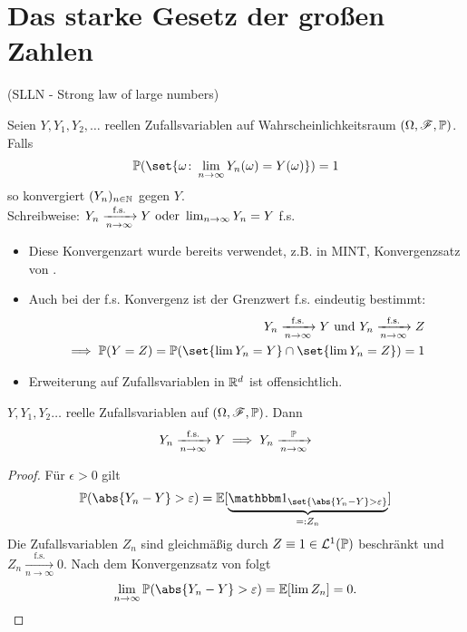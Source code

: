 \section{Das starke Gesetz der großen Zahlen}
(SLLN - Strong law of large numbers)\\
\begin{definition}
	Seien $Y,Y_1, Y_2, \dots$ reellen Zufallsvariablen auf Wahrscheinlichkeitsraum $(\O,\F,\P)$. Falls
	\begin{align*}
		\P(\set{\omega\colon \lim_{n\to \infty} Y_n(\omega) = Y(\omega)}) = 1
	\end{align*}
	so konvergiert $(Y_n)_{n\in \N}$  gegen $Y$.\\
	Schreibweise: $Y_n \xrightarrow[n \to \infty]{\text{f.s.}} Y \oder \lim_{n\to \infty} Y_n = Y$ f.s.
\end{definition}
\begin{*remark}
	\begin{itemize}
		\item Diese Konvergenzart wurde bereits verwendet, z.B. in MINT, Konvergenzsatz von .
		\item Auch bei der f.s. Konvergenz ist der Grenzwert f.s. eindeutig bestimmt:
		\begin{align*}
			Y_n \xrightarrow[n \to \infty]{\text{f.s.}}Y \und Y_n \xrightarrow[n \to \infty]{\text{f.s.}}Z\\
			\implies \P(Y=Z) = \P(\set{\lim Y_n = Y} \cap \set{\lim Y_n = Z}) = 1
		\end{align*}
		\item Erweiterung auf Zufallsvariablen in $\Rd$ ist offensichtlich.
	\end{itemize}
\end{*remark}
\begin{lemma}
	$Y,Y_1,Y_2 \dots$ reelle Zufallsvariablen auf $(\O,\F,\P)$. Dann
	\begin{align*}
		Y_n \xrightarrow[n \to \infty]{\text{f.s.}} Y \implies Y_n \xrightarrow[n \to \infty]{\P}
	\end{align*}
\end{lemma}
\begin{proof}
	Für $\epsilon > 0$ gilt
	\begin{align*}
		\P(\abs{Y_n - Y} > \epsilon) = \E[\underbrace{\indi_{\set{\abs{Y_n - Y}> \epsilon}}}_{=: Z_n}]
	\end{align*}
	Die Zufallsvariablen $Z_n$ sind gleichmäßig durch $Z \equiv 1 \in \Ln{1}(\P)$ beschränkt und $Z_n \xrightarrow[n \to \infty]{\text{f.s.}} 0$. Nach dem Konvergenzsatz von  folgt
	\[
		\lim_{n\to \infty} \P(\abs{Y_n - Y}> \epsilon) = \E[\lim Z_n] = 0.
	\]
\end{proof}
